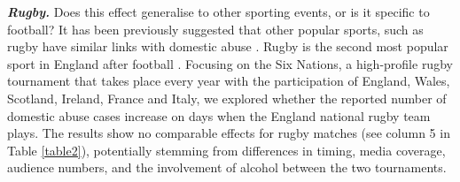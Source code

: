 \documentclass[12pt, a4paper]{article}
\begin{document}

\textbf{\textit{Rugby.}} Does this effect generalise to other sporting events, or is it specific to football?
It has been previously suggested that other popular sports, such as rugby have similar links with domestic abuse \citep{Brooks-Hay2018}. Rugby is the second most popular sport in England after football \citep{Ipsos2003}. Focusing on the Six Nations, a high-profile rugby tournament that takes place every year with the participation of England, Wales, Scotland, Ireland, France and Italy, we explored whether the reported number of domestic abuse cases increase on days when the England national rugby team plays. The results show no comparable effects for rugby matches (see column 5 in Table \ref{table2}), potentially stemming from differences in timing, media coverage, audience numbers, and the involvement of alcohol between the two tournaments. 
\end{document}
